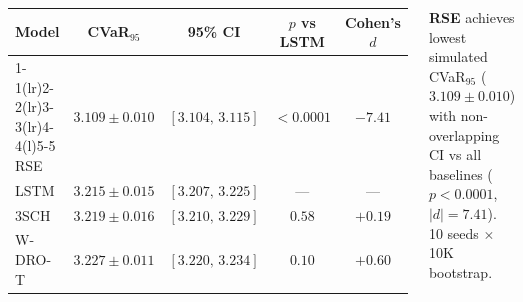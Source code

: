 \documentclass[25pt, a0paper, portrait]{tikzposter}
\begin{document}
\begin{columns}
{\smallskip
\begin{center}
\renewcommand{\arraystretch}{1.15}
\setlength{\tabcolsep}{4pt}
{\small
\begin{tabular}{@{}l c c c c@{}}
\toprule
\textbf{Model} & \textbf{CVaR$_{95}$} & \textbf{95\% CI}
  & \textbf{$p$ vs LSTM} & \textbf{Cohen's $d$}\\
\cmidrule(r){1-1}\cmidrule(lr){2-2}\cmidrule(lr){3-3}\cmidrule(lr){4-4}\cmidrule(l){5-5}
RSE        & $3.109 \pm 0.010$ & $[3.104,\,3.115]$ & $<\!0.0001$ & $-7.41$\\
LSTM       & $3.215 \pm 0.015$ & $[3.207,\,3.225]$ & ---         & ---\\
3SCH       & $3.219 \pm 0.016$ & $[3.210,\,3.229]$ & $0.58$      & $+0.19$\\
W-DRO-T    & $3.227 \pm 0.011$ & $[3.220,\,3.234]$ & $0.10$      & $+0.60$\\
\bottomrule
\end{tabular}}
\end{center}
\vspace{2pt}
{\small\color{SlateSecond}
\textbf{RSE} achieves lowest simulated CVaR$_{95}$ ($3.109\!\pm\!0.010$)
with non-overlapping CI vs all baselines ($p\!<\!0.0001$, $|d|\!=\!7.41$).
10 seeds $\times$ 10K bootstrap.}
}

\end{columns}
\end{document}
